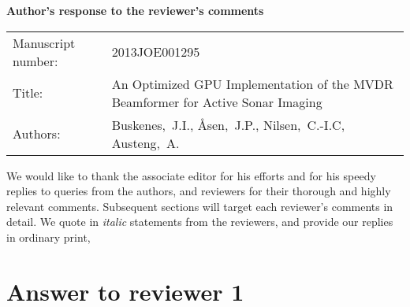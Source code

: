 \documentclass[11pt]{article} %
\newcommand\1{\vec 1}
\begin{document}

\begin{center}\Large\bf
Author's response to the reviewer's comments
\end{center}

\begin{center}
\begin{tabular}{l p{.6\linewidth}}\centering
Manuscript number: & 2013JOE001295 \\
Title: & An Optimized GPU Implementation of the MVDR Beamformer for Active Sonar Imaging \\
Authors: & Buskenes,~J.I., \AA{}sen,~J.P., Nilsen,~C.-I.C, Austeng,~A.
\end{tabular}
\end{center}

We would like to thank the associate editor for his efforts and for his speedy replies to queries from the authors, and reviewers for their thorough and highly relevant comments. Subsequent sections will target each reviewer's comments in detail. We quote in \textit{italic} statements from the reviewers, and provide our replies in ordinary print, 


\section{Answer to reviewer 1}
\end{document}
